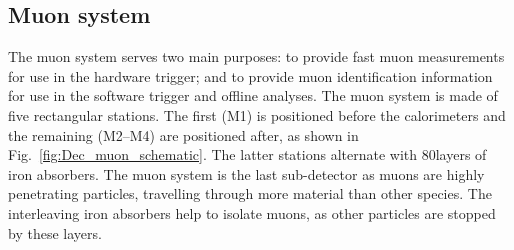 \subsection{Muon system}


The muon system serves two main purposes: to provide fast muon \pt measurements for use in the hardware trigger; and to provide muon identification information for use in the software trigger and offline analyses.
The muon system is made of five rectangular stations. The first (M1) is positioned before the calorimeters and the remaining (M2--M4) are positioned after, as shown in Fig.~\ref{fig:Dec_muon_schematic}. The latter stations alternate with 80\cm layers of iron absorbers. The muon system is the last sub-detector as muons are highly penetrating particles, travelling through more material than other species. The interleaving iron absorbers help to isolate muons, as other particles are stopped by these layers. 


